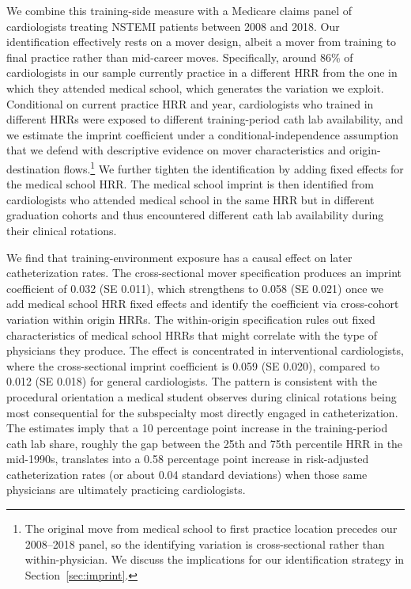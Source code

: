 \documentclass[12pt]{article}
\begin{document}
We combine this training-side measure with a Medicare claims panel of cardiologists treating NSTEMI patients between 2008 and 2018. Our identification effectively rests on a mover design, albeit a mover from training to final practice rather than mid-career moves. Specifically, around 86\% of cardiologists in our sample currently practice in a different HRR from the one in which they attended medical school, which generates the variation we exploit. Conditional on current practice HRR and year, cardiologists who trained in different HRRs were exposed to different training-period cath lab availability, and we estimate the imprint coefficient under a conditional-independence assumption that we defend with descriptive evidence on mover characteristics and origin-destination flows.\footnote{The original move from medical school to first practice location precedes our 2008--2018 panel, so the identifying variation is cross-sectional rather than within-physician. We discuss the implications for our identification strategy in Section~\ref{sec:imprint}.} We further tighten the identification by adding fixed effects for the medical school HRR. The medical school imprint is then identified from cardiologists who attended medical school in the same HRR but in different graduation cohorts and thus encountered different cath lab availability during their clinical rotations.

We find that training-environment exposure has a causal effect on later catheterization rates. The cross-sectional mover specification produces an imprint coefficient of 0.032 (SE 0.011), which strengthens to 0.058 (SE 0.021) once we add medical school HRR fixed effects and identify the coefficient via cross-cohort variation within origin HRRs. The within-origin specification rules out fixed characteristics of medical school HRRs that might correlate with the type of physicians they produce. The effect is concentrated in interventional cardiologists, where the cross-sectional imprint coefficient is 0.059 (SE 0.020), compared to 0.012 (SE 0.018) for general cardiologists. The pattern is consistent with the procedural orientation a medical student observes during clinical rotations being most consequential for the subspecialty most directly engaged in catheterization. The estimates imply that a 10 percentage point increase in the training-period cath lab share, roughly the gap between the 25th and 75th percentile HRR in the mid-1990s, translates into a 0.58 percentage point increase in risk-adjusted catheterization rates (or about 0.04 standard deviations) when those same physicians are ultimately practicing cardiologists.
\end{document}
